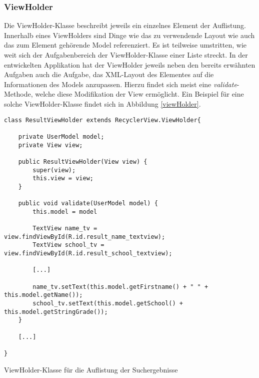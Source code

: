 \documentclass[../main.tex]{subfiles}
\begin{document}
	\subsubsection{ViewHolder}
	Die ViewHolder-Klasse beschreibt jeweils ein einzelnes Element der Auflistung. Innerhalb eines ViewHolders sind Dinge wie das zu verwendende Layout wie auch das zum Element gehörende Model referenziert. Es ist teilweise umstritten, wie weit sich der Aufgabenbereich der ViewHolder-Klasse einer Liste streckt. In der entwickelten Applikation hat der ViewHolder jeweils neben den bereits erwähnten Aufgaben auch die Aufgabe, das XML-Layout des Elementes auf die Informationen des Models anzupassen. Hierzu findet sich meist eine \emph{validate}-Methode, welche diese Modifikation der View ermöglicht. Ein Beispiel für eine solche ViewHolder-Klasse findet sich in Abbildung \ref{viewHolder}.

\begin{code}
	\begin{center}
		\begin{verbatim}
class ResultViewHolder extends RecyclerView.ViewHolder{
	
	private UserModel model;
	private View view;
	
	public ResultViewHolder(View view) {
		super(view);
		this.view = view;
	}
	
	public void validate(UserModel model) {
		this.model = model
	
		TextView name_tv = view.findViewById(R.id.result_name_textview);
		TextView school_tv = view.findViewById(R.id.result_school_textview);
		
		[...]
		
		name_tv.setText(this.model.getFirstname() + " " + this.model.getName());
		school_tv.setText(this.model.getSchool() + this.model.getStringGrade());
	}
	
	[...]
	
}
		\end{verbatim}
		\caption{ViewHolder-Klasse für die Auflistung der Suchergebnisse}
		\label{viewHolder}
	\end{center}
\end{code}

	
\end{document}
